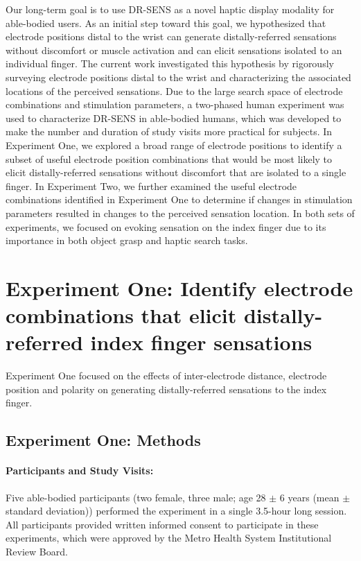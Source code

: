 \documentclass[10pt]{iopart}
\begin{document}
Our long-term goal is to use DR-SENS as a novel haptic display modality for able-bodied users. As an initial step toward this goal, we hypothesized that electrode positions distal to the wrist can generate distally-referred sensations without discomfort or muscle activation and can elicit sensations isolated to an individual finger. The current work investigated this hypothesis by rigorously surveying electrode positions distal to the wrist and characterizing the associated locations of the perceived sensations. Due to the large search space of electrode combinations and stimulation parameters, a two-phased human experiment was used to characterize DR-SENS in able-bodied humans, which was developed to make the number and duration of study visits more practical for subjects. In Experiment One, we explored a broad range of electrode positions to identify a subset of useful electrode position combinations that would be most likely to elicit distally-referred sensations without discomfort that are isolated to a single finger. In Experiment Two, we further examined the useful electrode combinations identified in Experiment One to determine if changes in stimulation parameters resulted in changes to the perceived sensation location. In both sets of experiments, we focused on evoking sensation on the index finger due to its importance in both object grasp and haptic search tasks. 

\section{Experiment One: Identify electrode combinations that elicit distally-referred index finger sensations}\label{sec:phase1}

Experiment One focused on the effects of inter-electrode distance, electrode position and polarity on generating distally-referred sensations to the index finger.

\subsection{Experiment One: Methods}

\paragraph{Participants and Study Visits:} Five able-bodied participants (two female, three male; age 28 $\pm$ 6 years (mean $\pm$ standard deviation)) performed the experiment in a single 3.5-hour long session. All participants provided written informed consent to participate in these experiments, which were approved by the Metro Health System Institutional Review Board. 
\end{document}
